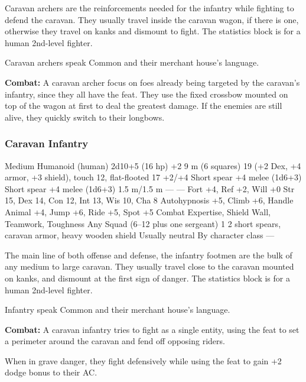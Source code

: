 Caravan archers are the reinforcements needed for the infantry while fighting to defend the caravan. They usually travel inside the caravan wagon, if there is one, otherwise they travel on kanks and dismount to fight. The statistics block is for a human 2nd-level fighter.

Caravan archers speak Common and their merchant house's language.

\textbf{Combat:} A caravan archer focus on foes already being targeted by the caravan's infantry, since they all have the  feat. They use the fixed crossbow mounted on top of the wagon at first to deal the greatest damage. If the enemies are still alive, they quickly switch to their longbows.

\subsubsection{Caravan Infantry}
\begin{MonsterStats}
{Medium Humanoid (human)}
{2d10+5 (16 hp)}
{+2}
{9 m (6 squares)}
{19 (+2 Dex, +4 armor, +3 shield), touch 12, flat-flooted 17}
{+2/+4}
{Short spear +4 melee (1d6+3)}
{Short spear +4 melee (1d6+3)}
{1.5 m/1.5 m}
{---}
{---}
{Fort +4, Ref +2, Will +0}
{Str 15, Dex 14, Con 12, Int 13, Wis 10, Cha 8}
{
	Autohypnosis +5,
	Climb +6,
	Handle Animal +4,
	Jump +6,
	Ride +5,
	Spot +5
}
{
	Combat Expertise,
	Shield Wall,
	Teamwork,
	Toughness
}
{Any}
{Squad (6--12 plus one sergeant)}
{1}
{2 short spears, caravan armor, heavy wooden shield}
{Usually neutral}
{By character class}
{---}
\end{MonsterStats}

The main line of both offense and defense, the infantry footmen are the bulk of any medium to large caravan. They usually travel close to the caravan mounted on kanks, and dismount at the first sign of danger. The statistics block is for a human 2nd-level fighter.

Infantry speak Common and their merchant house's language.

\textbf{Combat:} A caravan infantry tries to fight as a single entity, using the  feat to set a perimeter around the caravan and fend off opposing riders.

When in grave danger, they fight defensively while using the  feat to gain +2 dodge bonus to their AC.

